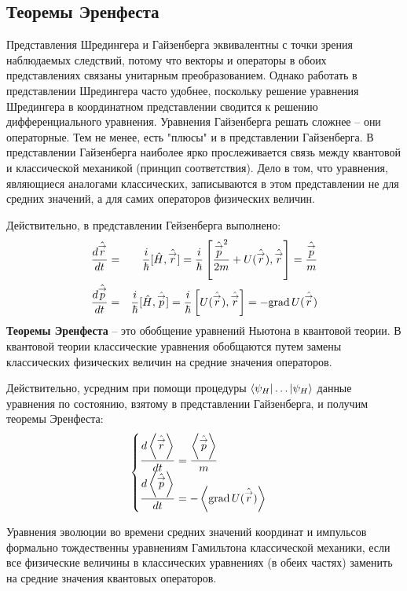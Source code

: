 \subsection{Теоремы Эренфеста}

Представления Шредингера и Гайзенберга эквивалентны с точки зрения наблюдаемых следствий, потому что векторы и операторы в обоих представлениях связаны унитарным преобразованием. Однако работать в представлении Шредингера часто удобнее, поскольку решение уравнения Шредингера в координатном представлении сводится к решению дифференциального уравнения. Уравнения Гайзенберга решать сложнее -- они операторные. Тем не менее, есть "плюсы"{} и в представлении Гайзенберга. В представлении Гайзенберга наиболее ярко прослеживается связь между квантовой и классической механикой (принцип соответствия). Дело в том, что уравнения, являющиеся аналогами классических, записываются в этом представлении не для средних значений, а для самих операторов физических величин.

Действительно, в представлении Гейзенберга выполнено:
\begin{eqnarray}
        \dfrac{d\Hat{\vec r}}{dt} &=& \dfrac{i}{\hbar} [\hat H, \hat{\vec r}]
        = \dfrac{i}{\hbar} \left[ \dfrac{{\Hat{\vec p}}^2}{2m} + U(\Hat{\vec r} ), \Hat {\vec r}  \right]
        = \dfrac{\Hat{\vec p}}{m} \\
        \dfrac{d\Hat{\vec p}}{dt} &=& \dfrac{i}{\hbar} [\hat H, \hat{\vec p}]
        = \dfrac{i}{\hbar} \left[ U(\Hat{\vec r}), \Hat {\Vec r}  \right]
        = - \mathrm{grad}\, U(\Hat{\vec{r}})
\end{eqnarray}
\textbf{Теоремы Эренфеста} -- это обобщение уравнений Ньютона в квантовой теории. В квантовой теории классические уравнения обобщаются путем замены классических физических величин на средние значения операторов.

Действительно, усредним при помощи процедуры ${ \langle \psi_H |\ldots| \psi_H \rangle }$ данные уравнения по состоянию, взятому в представлении Гайзенберга, и получим теоремы Эренфеста:
$$
    \begin{cases}
        \dfrac{d \left\langle \Hat{\overset{\to}{r}} \right\rangle}{dt} = \dfrac{\left\langle \Hat{\overset{\to}{p}} \right\rangle}{m}\\
        \dfrac{d \left\langle \Hat{\overset{\to}{p}} \right\rangle}{dt} =  -\left\langle \mathrm{grad}\, U(\Hat{\overset{\to}{r}})\right\rangle
    \end{cases}
$$

\Th
Уравнения эволюции во времени средних значений координат и импульсов формально тождественны уравнениям Гамильтона классической механики, если все физические величины в классических уравнениях (в обеих частях) заменить на средние значения квантовых операторов.

